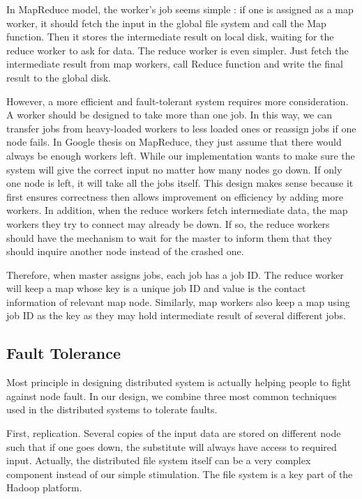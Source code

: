 \documentclass[12pt]{article}
\begin{document}
In MapReduce model, the worker's job seems simple : if one is assigned as a map worker, it should fetch the input in the global file system and
call the Map function. Then it stores the intermediate result on local disk, waiting for the reduce worker to ask for data. The reduce worker
is even simpler. Just fetch the intermediate result from map workers, call Reduce function and write the final result to the global disk. 

However, a more efficient and fault-tolerant system requires more consideration. A worker should be designed to take more than one job. In this
way, we can transfer jobs from heavy-loaded workers to less loaded ones or reassign jobs if one node fails. In Google thesis on MapReduce, they just assume that there would always be enough workers left. While our implementation wants to make sure the system will give the correct input no matter how many nodes go down. If only one node is left, it will take all the jobs itself. This design makes sense because it first ensures correctness then allows improvement on efficiency by adding more workers.
In addition, when the reduce workers fetch intermediate data, the map workers they try to connect may already be down. If so, the reduce workers
should have the mechanism to wait for the master to inform them that they should inquire another node instead of the crashed one.

Therefore, when master assigns jobs, each job has a job ID. The reduce worker will keep a map whose key is a unique job ID and value is the contact information of relevant map node. Similarly, map workers also keep a map using job ID as the key as they may hold intermediate result of several different jobs.
    
\subsection{Fault Tolerance}

Most principle in designing distributed system is actually helping people to fight against node fault. In our design, we combine three most common techniques used in the distributed systems to tolerate faults.

First, replication. Several copies of the input data are stored on different node such that if one goes down, the substitute will always have access to required input. Actually, the distributed file system itself can be a very complex component instead of our simple stimulation. The file system is a key part of the Hadoop platform.   
\end{document}
